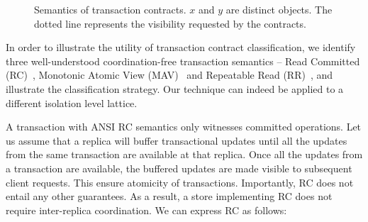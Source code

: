 \begin{figure}
\vspace{-2.3mm}
\centering
{}
\hfill
{}
\hfill
{}
\caption{Semantics of transaction contracts. $x$ and $y$ are distinct objects.
The dotted line represents the visibility requested by the contracts.}
\label{fig:transaction}
\end{figure}

In order to illustrate the utility of transaction contract classification, we
identify three well-understood coordination-free transaction semantics -- Read
Committed (RC)~\cite{Berenson95}, Monotonic Atomic View (MAV)~\cite{BailisHAT}
and Repeatable Read (RR)~\cite{Berenson95}, and illustrate the classification
strategy. Our technique can indeed be applied to a different isolation level
lattice.

A transaction with ANSI RC semantics only witnesses committed operations. Let
us assume that a replica will buffer transactional updates until all the
updates from the same transaction are available at that replica. Once all the
updates from a transaction are available, the buffered updates are made visible
to subsequent client requests. This ensure atomicity of transactions.
Importantly, RC does not entail any other guarantees. As a result, a store
implementing RC does not require inter-replica coordination. We can express RC
as follows:

